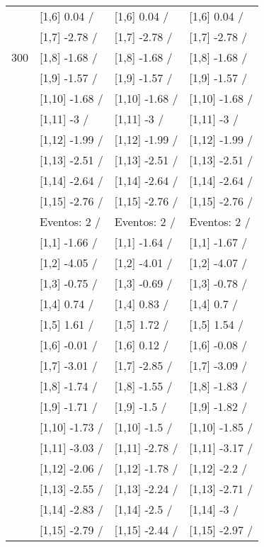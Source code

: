 \begin{table}
\begin{tabular}[t]{llll}
 & {}[1,6] 0.04  / & {}[1,6] 0.04  / & {}[1,6] 0.04  /\\
 & {}[1,7] -2.78  / & {}[1,7] -2.78  / & {}[1,7] -2.78  /\\
300 & {}[1,8] -1.68  / & {}[1,8] -1.68  / & {}[1,8] -1.68  /\\
\addlinespace
 & {}[1,9] -1.57  / & {}[1,9] -1.57  / & {}[1,9] -1.57  /\\
 & {}[1,10] -1.68  / & {}[1,10] -1.68  / & {}[1,10] -1.68  /\\
 & {}[1,11] -3  / & {}[1,11] -3  / & {}[1,11] -3  /\\
 & {}[1,12] -1.99  / & {}[1,12] -1.99  / & {}[1,12] -1.99  /\\
 & {}[1,13] -2.51  / & {}[1,13] -2.51  / & {}[1,13] -2.51  /\\
\addlinespace
 & {}[1,14] -2.64  / & {}[1,14] -2.64  / & {}[1,14] -2.64  /\\
 & {}[1,15] -2.76  / & {}[1,15] -2.76  / & {}[1,15] -2.76  /\\
 & Eventos:  2 / & Eventos:  2 / & Eventos:  2 /\\
 & {}[1,1] -1.66  / & {}[1,1] -1.64  / & {}[1,1] -1.67  /\\
 & {}[1,2] -4.05  / & {}[1,2] -4.01  / & {}[1,2] -4.07  /\\
\addlinespace
 & {}[1,3] -0.75  / & {}[1,3] -0.69  / & {}[1,3] -0.78  /\\
 & {}[1,4] 0.74  / & {}[1,4] 0.83  / & {}[1,4] 0.7  /\\
 & {}[1,5] 1.61  / & {}[1,5] 1.72  / & {}[1,5] 1.54  /\\
 & {}[1,6] -0.01  / & {}[1,6] 0.12  / & {}[1,6] -0.08  /\\
 & {}[1,7] -3.01  / & {}[1,7] -2.85  / & {}[1,7] -3.09  /\\
\addlinespace
500 & {}[1,8] -1.74  / & {}[1,8] -1.55  / & {}[1,8] -1.83  /\\
 & {}[1,9] -1.71  / & {}[1,9] -1.5  / & {}[1,9] -1.82  /\\
 & {}[1,10] -1.73  / & {}[1,10] -1.5  / & {}[1,10] -1.85  /\\
 & {}[1,11] -3.03  / & {}[1,11] -2.78  / & {}[1,11] -3.17  /\\
 & {}[1,12] -2.06  / & {}[1,12] -1.78  / & {}[1,12] -2.2  /\\
\addlinespace
 & {}[1,13] -2.55  / & {}[1,13] -2.24  / & {}[1,13] -2.71  /\\
 & {}[1,14] -2.83  / & {}[1,14] -2.5  / & {}[1,14] -3  /\\
 & {}[1,15] -2.79  / & {}[1,15] -2.44  / & {}[1,15] -2.97  /\\
\bottomrule
\end{tabular}
\end{table}
